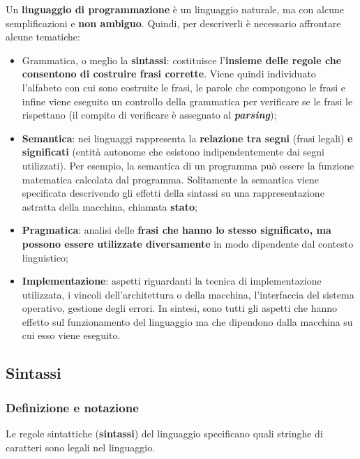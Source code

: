 \documentclass[a4paper]{article}
\begin{document}
	Un \textbf{linguaggio di programmazione} è un linguaggio naturale, ma con alcune semplificazioni e \textbf{non ambiguo}. Quindi, per descriverli è necessario affrontare alcune tematiche:
	\begin{itemize}
		\item Grammatica, o meglio la \textcolor{Red3}{\textbf{sintassi}}: costituisce l'\textbf{insieme delle regole che consentono di costruire frasi corrette}. Viene quindi individuato l'alfabeto con cui sono costruite le frasi, le parole che compongono le frasi e infine viene eseguito un controllo della grammatica per verificare se le frasi le rispettano (il compito di verificare è assegnato al \textbf{\emph{parsing}});
		\item \textcolor{Red3}{\textbf{Semantica}}: nei linguaggi rappresenta la \textbf{relazione tra segni} (frasi legali) \textbf{e significati} (entità autonome che esistono indipendentemente dai segni utilizzati). Per esempio, la semantica di un programma può essere la funzione matematica calcolata dal programma. Solitamente la semantica viene specificata descrivendo gli effetti della sintassi su una rappresentazione astratta della macchina, chiamata \textbf{stato};
		\item \textcolor{Red3}{\textbf{Pragmatica}}: analisi delle \textbf{frasi che hanno lo stesso significato, ma possono essere utilizzate diversamente} in modo dipendente dal contesto linguistico;
		\item \textcolor{Red3}{\textbf{Implementazione}}: aspetti riguardanti la tecnica di implementazione utilizzata, i vincoli dell'architettura o della macchina, l'interfaccia del sistema operativo, gestione degli errori.\newline
		In sintesi, sono tutti gli aspetti che hanno effetto sul funzionamento del linguaggio ma che dipendono dalla macchina su cui esso viene eseguito.
	\end{itemize}\newpage

	\subsection{Sintassi}

	\subsubsection{Definizione e notazione}

	Le regole sintattiche (\textcolor{Red3}{\textbf{sintassi}}) del linguaggio specificano quali stringhe di caratteri sono legali nel linguaggio.\newline
	
\end{document}
